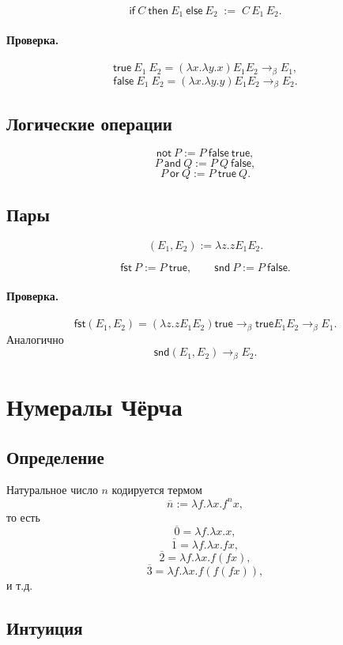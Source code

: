 \documentclass[12pt,a4paper]{article}
\theoremstyle{remark}
\begin{document}
\[
\mathsf{if}\ C\ \mathsf{then}\ E_1\ \mathsf{else}\ E_2
\;:=\;
C\,E_1\,E_2.
\]

\paragraph{Проверка.}
\[
\mathsf{true}\ E_1\ E_2
=
(\lambda x.\lambda y.x)E_1E_2
\to_\beta E_1,
\]
\[
\mathsf{false}\ E_1\ E_2
=
(\lambda x.\lambda y.y)E_1E_2
\to_\beta E_2.
\]

\subsection{Логические операции}

\[
\mathsf{not}\ P := P\ \mathsf{false}\ \mathsf{true},
\]
\[
P\ \mathsf{and}\ Q := P\ Q\ \mathsf{false},
\]
\[
P\ \mathsf{or}\ Q := P\ \mathsf{true}\ Q.
\]

\subsection{Пары}

\[
(E_1,E_2):=\lambda z.zE_1E_2.
\]

\[
\mathsf{fst}\ P := P\ \mathsf{true},
\qquad
\mathsf{snd}\ P := P\ \mathsf{false}.
\]

\paragraph{Проверка.}
\[
\mathsf{fst}(E_1,E_2)
=
(\lambda z.zE_1E_2)\mathsf{true}
\to_\beta
\mathsf{true}E_1E_2
\to_\beta E_1.
\]
Аналогично
\[
\mathsf{snd}(E_1,E_2)\to_\beta E_2.
\]

\section{Нумералы Чёрча}

\subsection{Определение}

Натуральное число $n$ кодируется термом
\[
\overline{n}:=\lambda f.\lambda x.f^n x,
\]
то есть
\[
\overline{0}=\lambda f.\lambda x.x,
\]
\[
\overline{1}=\lambda f.\lambda x.fx,
\]
\[
\overline{2}=\lambda f.\lambda x.f(fx),
\]
\[
\overline{3}=\lambda f.\lambda x.f(f(fx)),
\]
и т.д.

\subsection{Интуиция}
\end{document}
